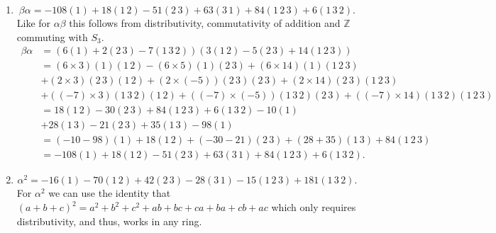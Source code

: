 \documentclass[12 pt, letterpaper]{hmcpset}
\begin{document}
\begin{solution}
\begin{enumerate}
\[\begin{split}
						     & + (3 \times(-7))(1 \, 2)(1 \, 3 \, 2) + ((-5) \times (-7))(2 \, 3)(1 \, 3 \, 2) + (14 \times (-7))(1 \, 2 \, 3)(1 \, 3 \, 2) \\
						     & = 18 (1 \, 2) - 30 (2 \, 3) + 84 (1 \, 2 \, 3) + 6 (1 \, 2 \, 3) - 10(1) \\
						     & + 28 (2 \, 1) - 21 (1 \, 3) + 35 (2 \, 1) - 98 (1) \\
						     & = (-10 - 98)(1) + (18 + 28 + 35)(1 \, 2) - 30 (2 \, 3) - 21 (1 \, 3) + (84 + 6)(1 \, 2 \, 3) \\
						     & = -108 (1) + 81 (1 \, 2) - 30 (2 \, 3) - 21 (3 \, 1) + 90 (1 \, 2 \, 3).
				\end{split}
			\]
		\item
			\[
				\boxed{
					\beta \alpha = -108 (1) + 18 (1 \, 2) - 51 (2 \, 3) + 63 (3 \, 1) + 84 (1 \, 2 \, 3) + 6 (1 \, 3 \, 2).
				}
			\]
			Like for $\alpha \beta$ this follows from distributivity, commutativity of addition and $\mathbb{Z}$ commuting with $S_{3}$.
			\[
				\begin{split}
					\beta \alpha & = (6(1) + 2(2 \, 3) - 7(1 \, 3 \, 2))(3(1 \, 2) - 5 (2 \, 3) + 14(1 \, 2 \, 3)) \\
						     & = (6 \times 3) (1) (1 \, 2) - (6 \times 5) (1) (2 \, 3) + (6 \times 14) (1) (1 \, 2 \, 3) \\
						     & + (2 \times 3) (2 \, 3) (1 \, 2) + (2 \times (-5)) (2 \, 3) (2 \, 3) + (2 \times 14) (2 \, 3) (1 \, 2 \, 3) \\
						     & + ((-7) \times 3) (1 \, 3 \, 2) (1 \, 2) + ((-7) \times (-5)) (1 \, 3 \, 2) (2 \, 3) + ((-7) \times 14) (1 \, 3 \, 2) (1 \, 2 \, 3) \\
						     & = 18 (1 \, 2) - 30 (2 \, 3) + 84 (1 \, 2 \, 3) + 6 (1 \, 3 \, 2) - 10(1) \\
						     & + 28 (1 \, 3) - 21 (2 \, 3) + 35 (1 \, 3) - 98 (1) \\
						     & = (-10 - 98)(1) + 18 (1 \, 2) + (-30 - 21) (2 \, 3) + (28 + 35) (1 \, 3) + 84 (1 \, 2 \, 3) \\
						     & = -108 (1) + 18 (1 \, 2) - 51 (2 \, 3) + 63 (3 \, 1) + 84 (1 \, 2 \, 3) + 6 (1 \, 3 \, 2).
				\end{split}
			\]
		\item
			\[
				\boxed{
					\alpha^{2} = -16 (1) - 70 (1 \, 2) + 42 (2 \, 3) - 28 (3 \, 1) -15 (1 \, 2 \, 3) + 181 (1 \, 3 \, 2).
				}
			\]
			For $\alpha^{2}$ we can use the identity that $(a + b + c)^{2} = a^{2} + b^{2} + c^{2} + ab + bc + ca + ba + cb + ac$ which only requires distributivity, and thus, works in any ring.

\end{enumerate}
\end{solution}
\end{document}
